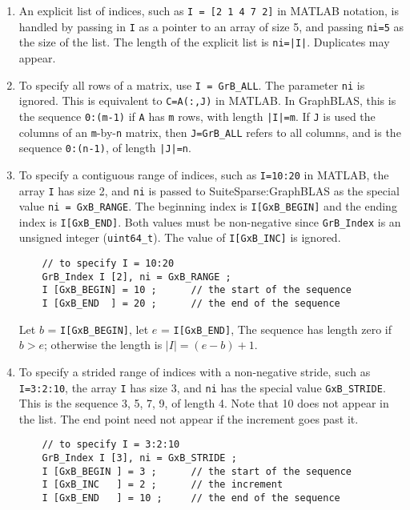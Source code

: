 \documentclass[12pt]{article}
\begin{document}
\begin{enumerate}
\item
    An explicit list of indices, such as \verb'I = [2 1 4 7 2]' in MATLAB
    notation, is handled by passing in \verb'I' as a pointer to an array of
    size 5, and passing \verb'ni=5' as the size of the list.
    The length of the explicit list is \verb'ni=|I|'.
    Duplicates may appear.

\item To specify all rows of a matrix, use \verb'I = GrB_ALL'.  The
    parameter \verb'ni' is ignored.  This is equivalent to \verb'C=A(:,J)'
    in MATLAB.  In GraphBLAS, this is the sequence \verb'0:(m-1)' if \verb'A'
    has \verb'm' rows, with length \verb'|I|=m'.  If \verb'J' is used the
    columns of an \verb'm'-by-\verb'n' matrix, then \verb'J=GrB_ALL' refers to
    all columns, and is the sequence \verb'0:(n-1)', of length \verb'|J|=n'.

\item To specify a contiguous range of indices, such as \verb'I=10:20'
    in MATLAB, the array \verb'I' has size 2, and \verb'ni' is passed to
    SuiteSparse:GraphBLAS as the special value \verb'ni = GxB_RANGE'.  The
    beginning index is \verb'I[GxB_BEGIN]' and the ending index is
    \verb'I[GxB_END]'.   Both values must be non-negative since
    \verb'GrB_Index' is an unsigned integer (\verb'uint64_t').  The value of
    \verb'I[GxB_INC]' is ignored.

    {\footnotesize
    \begin{verbatim}
    // to specify I = 10:20
    GrB_Index I [2], ni = GxB_RANGE ;
    I [GxB_BEGIN] = 10 ;      // the start of the sequence
    I [GxB_END  ] = 20 ;      // the end of the sequence \end{verbatim}}

    Let $b$ = \verb'I[GxB_BEGIN]', let $e$ = \verb'I[GxB_END]',
    The sequence has length zero if $b > e$; otherwise the length is
    $|I| = (e-b) + 1$.

\item To specify a strided range of indices with a non-negative stride,
    such as \verb'I=3:2:10', the array \verb'I' has size 3, and \verb'ni' has
    the special value \verb'GxB_STRIDE'.  This is the sequence 3, 5, 7, 9, of
    length 4.  Note that 10 does not appear in the list.  The end point need
    not appear if the increment goes past it.

    {\footnotesize
    \begin{verbatim}
    // to specify I = 3:2:10
    GrB_Index I [3], ni = GxB_STRIDE ;
    I [GxB_BEGIN ] = 3 ;      // the start of the sequence
    I [GxB_INC   ] = 2 ;      // the increment
    I [GxB_END   ] = 10 ;     // the end of the sequence \end{verbatim}}


\end{enumerate}
\end{document}
